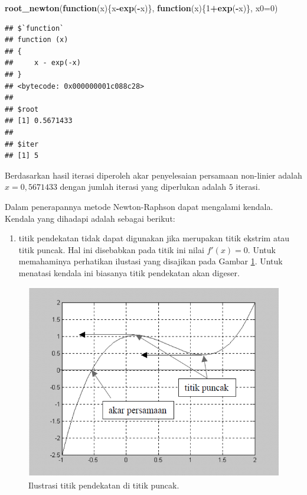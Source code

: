 \documentclass[]{book}
\newenvironment{Shaded}{\begin{snugshade}}{\end{snugshade}}
\newcommand{\ControlFlowTok}[1]{\textcolor[rgb]{0.13,0.29,0.53}{\textbf{#1}}}
\newcommand{\DataTypeTok}[1]{\textcolor[rgb]{0.13,0.29,0.53}{#1}}
\newcommand{\DecValTok}[1]{\textcolor[rgb]{0.00,0.00,0.81}{#1}}
\newcommand{\KeywordTok}[1]{\textcolor[rgb]{0.13,0.29,0.53}{\textbf{#1}}}
\newcommand{\NormalTok}[1]{#1}
\newcommand{\OperatorTok}[1]{\textcolor[rgb]{0.81,0.36,0.00}{\textbf{#1}}}
\providecommand{\tightlist}{%
  \setlength{\itemsep}{0pt}\setlength{\parskip}{0pt}}
\theoremstyle{definition}
\theoremstyle{definition}
\theoremstyle{definition}
\theoremstyle{remark}
\begin{document}
\begin{Shaded}
\begin{Highlighting}[]
\KeywordTok{root_newton}\NormalTok{(}\ControlFlowTok{function}\NormalTok{(x)\{x}\OperatorTok{-}\KeywordTok{exp}\NormalTok{(}\OperatorTok{-}\NormalTok{x)\},}
            \ControlFlowTok{function}\NormalTok{(x)\{}\DecValTok{1}\OperatorTok{+}\KeywordTok{exp}\NormalTok{(}\OperatorTok{-}\NormalTok{x)\},}
              \DataTypeTok{x0=}\DecValTok{0}\NormalTok{)}
\end{Highlighting}
\end{Shaded}

\begin{verbatim}
## $`function`
## function (x) 
## {
##     x - exp(-x)
## }
## <bytecode: 0x000000001c088c28>
## 
## $root
## [1] 0.5671433
## 
## $iter
## [1] 5
\end{verbatim}

Berdasarkan hasil iterasi diperoleh akar penyelesaian persamaan non-linier adalah \(x=0,5671433\) dengan jumlah iterasi yang diperlukan adalah \(5\) iterasi.

Dalam penerapannya metode Newton-Raphson dapat mengalami kendala. Kendala yang dihadapi adalah sebagai berikut:

\begin{enumerate}
\def\labelenumi{\arabic{enumi}.}
\tightlist
\item
  titik pendekatan tidak dapat digunakan jika merupakan titik ekstrim atau titik puncak. Hal ini disebabkan pada titik ini nilai \(f'\left(x \right)=0\). Untuk memahaminya perhatikan ilustasi yang disajikan pada Gambar \ref{fig:nrviz2}. Untuk menatasi kendala ini biasanya titik pendekatan akan digeser.
\end{enumerate}

\begin{figure}

{\centering \includegraphics[width=0.9\linewidth]{./images/nrviz2} 

}

\caption{Ilustrasi titik pendekatan di titik puncak.}\label{fig:nrviz2}
\end{figure}
\end{document}
